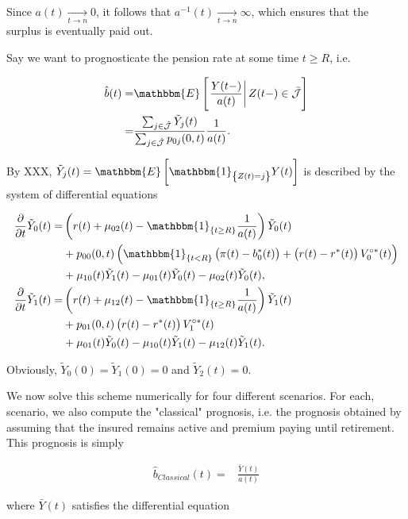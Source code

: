 \documentclass{book}
\newcommand{\1}[1]{\mathbbm{1}_{\left\lbrace #1 \right\rbrace}}
\newcommand{\expec}[1][def]{\mathbbm{E} \left[ #1 \right]}
\newcommand{\econd}[2][def]{\mathbbm{E} \left[ \left. #1 \right| #2 \right]}
\theoremstyle{break}
\theoremstyle{remark}
\numberwithin{equation}{section}
\begin{document}
Since $a(t) \underset{t \to n}{\longrightarrow} 0$, it follows that $a^{-1}(t) \underset{t \to n}{\longrightarrow} \infty$, which ensures that the surplus is eventually paid out.

Say we want to prognosticate the pension rate at some time $t \geq R$, i.e.

\begin{align*}
	\hat{b}(t) =& \econd[\frac{Y(t-)}{a(t)}]{Z(t-) \in \bar{\mathcal{J}}} \\
	=&\frac{\sum_{j \in \hat{\mathcal{J}}} \tilde{Y}_j(t)}{\sum_{j \in \hat{\mathcal{J}}} p_{0j}(0,t)} \frac{1}{a(t)}.
\end{align*}

By XXX, $\tilde{Y}_j(t) = \expec[\1{Z(t)=j} Y(t)]$ is described by the system of differential equations

\begin{align} \label{Jaja}
\begin{split}
	\frac{\partial}{\partial t} \tilde{Y}_0(t) =& \left( r(t) + \mu_{02}(t) - \1{t \geq R} \frac{1}{a(t)}\right) \tilde{Y}_0(t) \\
	&+ p_{00}(0,t) \left( \1{t<R} \left(\pi(t) - b_0^*(t)\right) + \left( r(t) - r^*(t) \right) V_{0}^{\circ*}(t) \right) \\
	&+ \mu_{10}(t) \tilde{Y}_1(t) - \mu_{01}(t) \tilde{Y}_0(t) - \mu_{02}(t) \tilde{Y}_0(t), \\
	\frac{\partial}{\partial t} \tilde{Y}_1(t) =& \left( r(t) + \mu_{12}(t) - \1{t \geq R} \frac{1}{a(t)}\right) \tilde{Y}_1(t) \\
	&+ p_{01}(0,t) \left( r(t) - r^*(t) \right) V_{1}^{\circ*}(t) \\
	&+ \mu_{01}(t) \tilde{Y}_0(t) - \mu_{10}(t) \tilde{Y}_1(t) - \mu_{12}(t) \tilde{Y}_1(t).
\end{split}
\end{align}

Obviously, $\tilde{Y}_0(0)=\tilde{Y}_1(0)=0$ and $\tilde{Y}_2(t)=0$.

We now solve this scheme numerically for four different scenarios. For each, scenario, we also compute the "classical" prognosis, i.e. the prognosis obtained by assuming that the insured remains active and premium paying until retirement. This prognosis is simply

\begin{align*}
	\hat{b}_{Classical}(t) =& \frac{\bar{Y}(t)}{a(t)}
\end{align*}

where $\bar{Y}(t)$ satisfies the differential equation
\end{document}
